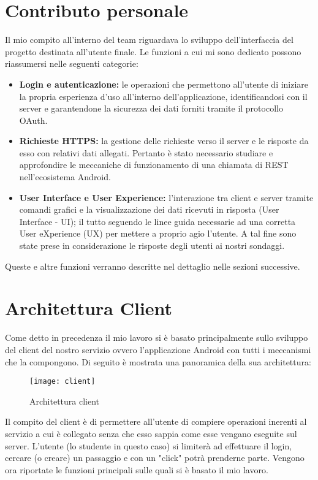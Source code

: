 \section{Contributo personale}
Il mio compito all’interno del team riguardava lo sviluppo dell'interfaccia del progetto destinata all'utente finale. 
Le funzioni a cui mi sono dedicato possono riassumersi nelle seguenti categorie:
\begin{itemize}
\item \textbf{Login e autenticazione:} le operazioni che permettono all’utente di iniziare la propria esperienza d’uso all’interno dell’applicazione, identificandosi con il server e garantendone la sicurezza dei dati forniti tramite il protocollo OAuth. 
\item \textbf{Richieste HTTPS:} la gestione delle richieste verso il server e le risposte da esso con relativi dati allegati. Pertanto è stato necessario studiare e approfondire le meccaniche di funzionamento di una chiamata di REST nell'ecosistema Android.
\item \textbf{User Interface e User Experience:} l’interazione tra client e server tramite comandi grafici e la visualizzazione dei dati ricevuti in risposta (User Interface - UI); il tutto seguendo le linee guida necessarie ad una corretta User eXperience (UX) per mettere a proprio agio l’utente. A tal fine sono state prese in considerazione le risposte degli utenti ai nostri sondaggi.
\end{itemize}
Queste e altre funzioni verranno descritte nel dettaglio nelle sezioni successive.

\section{Architettura Client}
Come detto in precedenza il mio lavoro si è basato principalmente sullo sviluppo del client del nostro servizio ovvero l'applicazione Android con tutti i meccanismi che la compongono.
Di seguito è mostrata una panoramica della sua architettura:

\begin{figure}[!h]
  \centering
    \texttt{[image: client]}
  \caption{Architettura client}
  \label{fig:client}
\end{figure}
\FloatBarrier

Il compito del client è di permettere all'utente di compiere operazioni inerenti al servizio a cui è collegato senza che esso sappia come esse vengano eseguite sul server.
L'utente (lo studente in questo caso) si limiterà ad effettuare il login, cercare (o creare) un passaggio e con un "click" potrà prenderne parte.
Vengono ora riportate le funzioni principali sulle quali si è basato il mio lavoro.


